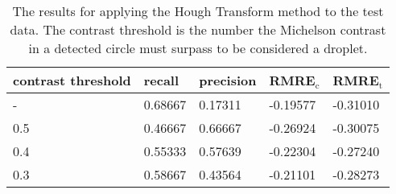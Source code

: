 \begin{table}[htbp]
    \centering
    \begin{tabular}{lllll}
        \toprule
        contrast threshold & recall  & precision & RMRE$_\text{c}$ & RMRE$_\text{t}$ \\ \midrule
        -                  & 0.68667 & 0.17311   & -0.19577        & -0.31010       \\
        0.5                & 0.46667 & 0.66667   & -0.26924        & -0.30075        \\
        0.4                & 0.55333 & 0.57639   & -0.22304        & -0.27240        \\
        0.3                & 0.58667 & 0.43564   & -0.21101        & -0.28273        \\ \bottomrule
    \end{tabular}
    \vspace{0.2cm}
    \caption{The results for applying the Hough Transform method to the test data. The contrast threshold is the number the Michelson contrast in a detected circle must surpass to be considered a droplet.}
    \label{tab:results_hough}
\end{table}
